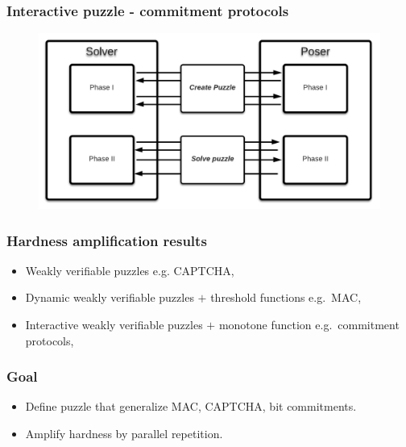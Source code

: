 \documentclass[first,firstsupp, last]{ETHclass}
\begin{document}
\begin{frame}[t]
  \frametitle{Interactive puzzle - commitment protocols}
  \begin{figure}
    \includegraphics[scale=0.43]{images/IntProtocol.pdf}
  \end{figure}
\end{frame}

\begin{frame}[t]
  \frametitle{Hardness amplification results}
  \begin{itemize}
    \item<1-3> Weakly verifiable puzzles e.g. CAPTCHA, \cite{canetti2005hardness}
    \item<2-3> Dynamic weakly verifiable puzzles $+$ threshold functions e.g.~MAC,\cite{dodis2009security}
    \item<3> Interactive weakly verifiable puzzles $+$ monotone function e.g.~commitment protocols, \cite{holenstein2011general}
  \end{itemize}
  \centering
\end{frame}

\begin{frame}[t]
  \frametitle{Goal}
  \begin{itemize}
    \item Define puzzle that generalize MAC, CAPTCHA, bit commitments.
    \item Amplify hardness by parallel repetition.
  \end{itemize}
  \vspace{40pt}
  \begin{figure}
    \centering
  \end{figure}
\end{frame}
\end{document}
